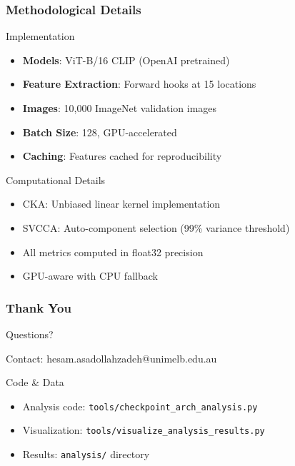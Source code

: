 \documentclass[aspectratio=1610, fontsize=8pt]{beamer}
\begin{document}
\begin{frame}
    \frametitle{Methodological Details}
    \begin{block}{Implementation}
        \begin{itemize}
            \item \textbf{Models}: ViT-B/16 CLIP (OpenAI pretrained)
            \item \textbf{Feature Extraction}: Forward hooks at 15 locations
            \item \textbf{Images}: 10,000 ImageNet validation images
            \item \textbf{Batch Size}: 128, GPU-accelerated
            \item \textbf{Caching}: Features cached for reproducibility
        \end{itemize}
    \end{block}
    
    \begin{block}{Computational Details}
        \begin{itemize}
            \item CKA: Unbiased linear kernel implementation
            \item SVCCA: Auto-component selection (99\% variance threshold)
            \item All metrics computed in float32 precision
            \item GPU-aware with CPU fallback
        \end{itemize}
    \end{block}
\end{frame}

\begin{frame}
    \frametitle{Thank You}
    \begin{center}
        \Huge Questions?
        
        \vspace{1cm}
        \Large Contact: hesam.asadollahzadeh@unimelb.edu.au
    \end{center}
    
    \vspace{1cm}
    \begin{block}{Code \& Data}
        \begin{itemize}
            \item Analysis code: \texttt{tools/checkpoint\_arch\_analysis.py}
            \item Visualization: \texttt{tools/visualize\_analysis\_results.py}
            \item Results: \texttt{analysis/} directory
        \end{itemize}
    \end{block}
\end{frame}
\end{document}
